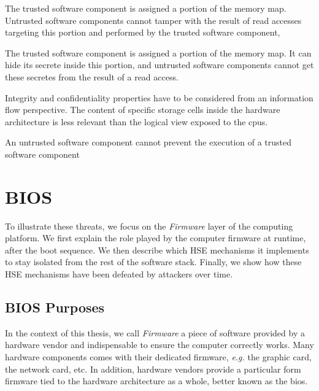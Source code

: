 \begin{definition}[Integrity]
  The trusted software component is assigned a portion of the memory map.
  Untrusted software components cannot tamper with the result of read accesses
  targeting this portion and performed by the trusted software component,
\end{definition}

\begin{definition}[Confidentiality]
  The trusted software component is assigned a portion of the memory map.
  It can hide its secrete inside this portion, and untrusted software components
  cannot get these secretes from the result of a read access.
\end{definition}

Integrity and confidentiality properties have to be considered from an
information flow perspective.
%
The content of specific storage cells inside the hardware architecture is less
relevant than the logical view exposed to the \acp{cpu}.

\begin{definition}[Availability]
  An untrusted software component cannot prevent the execution of a trusted
  software component
\end{definition}


\section{BIOS}
\label{sec:usecase:firmware}

To illustrate these threats, we focus on the \emph{Firmware} layer of the
computing platform.
%
We first explain the role played by the computer firmware at runtime, after the
boot sequence.
%
We then describe which HSE mechanisms it implements to stay isolated from the
rest of the software stack.
%
Finally, we show how these HSE mechanisms have been defeated by attackers over
time.

\subsection{BIOS Purposes}

In the context of this thesis, we call \emph{Firmware} a piece of software
provided by a hardware vendor and indispensable to ensure the computer correctly
works.
%
Many hardware components comes with their dedicated firmware, \emph{e.g.} the
graphic card, the network card, etc.
%
In addition, hardware vendors provide a particular form firmware tied to the
hardware architecture as a whole, better known as the \ac{bios}.

